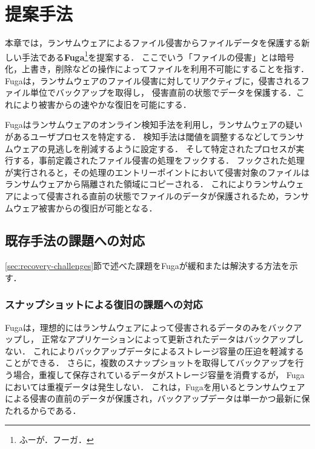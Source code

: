\chapter{提案手法}
\label{chap:approach}
本章では，ランサムウェアによるファイル侵害からファイルデータを保護する新しい手法である\textbf{Fuga}\footnote{ふーが．フーガ．}を提案する．
ここでいう「ファイルの侵害」とは暗号化，上書き，削除などの操作によってファイルを利用不可能にすることを指す．
Fugaは，ランサムウェアのファイル侵害に対してリアクティブに，侵害されるファイル単位でバックアップを取得し，
侵害直前の状態でデータを保護する．これにより被害からの速やかな復旧を可能にする．

Fugaはランサムウェアのオンライン検知手法を利用し，ランサムウェアの疑いがあるユーザプロセスを特定する．
検知手法は閾値を調整するなどしてランサムウェアの見逃しを削減するように設定する．
そして特定されたプロセスが実行する，事前定義されたファイル侵害の処理をフックする．
フックされた処理が実行されると，その処理のエントリーポイントにおいて侵害対象のファイルはランサムウェアから隔離された領域にコピーされる．
これによりランサムウェアによって侵害される直前の状態でファイルのデータが保護されるため，ランサムウェア被害からの復旧が可能となる．

\section{既存手法の課題への対応}
\ref{sec:recovery-challenges}節で述べた課題をFugaが緩和または解決する方法を示す．
\subsection{スナップショットによる復旧の課題への対応}
Fugaは，理想的にはランサムウェアによって侵害されるデータのみをバックアップし，
正常なアプリケーションによって更新されたデータはバックアップしない．
これによりバックアップデータによるストレージ容量の圧迫を軽減することができる．
さらに，複数のスナップショットを取得してバックアップを行う場合，重複して保存されているデータがストレージ容量を消費するが，
Fugaにおいては重複データは発生しない．
これは，Fugaを用いるとランサムウェアによる侵害の直前のデータが保護され，バックアップデータは単一かつ最新に保たれるからである．

